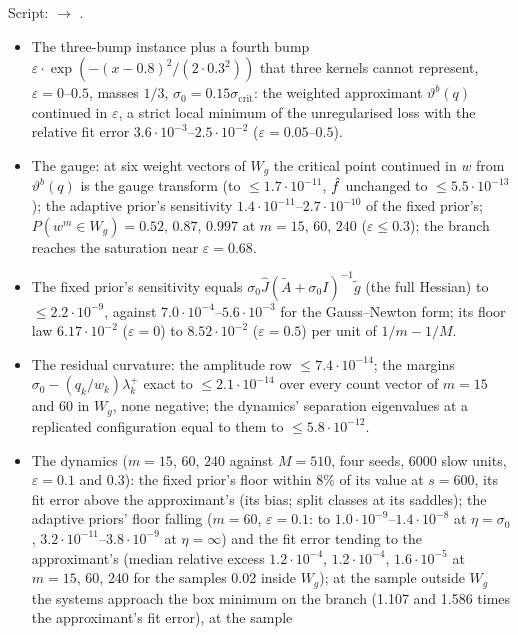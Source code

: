 Script:  $\to$ .
\begin{itemize}
  \item The three-bump instance plus a fourth bump $\varepsilon\cdot\exp(-(x-0.8)^2/(2\cdot0.3^2))$ that three kernels
    cannot represent, $\varepsilon=0$--$0.5$, masses $1/3$, $\sigma_0=0.15\sigma_{\mathrm{crit}}$: the weighted
    approximant $\vartheta^b(q)$ continued in $\varepsilon$, a strict local minimum of the unregularised loss with the
    relative fit error $3.6\cdot10^{-3}$--$2.5\cdot10^{-2}$ ($\varepsilon=0.05$--$0.5$).
  \item The gauge: at six weight vectors of $W_g$ the critical point continued in $w$ from $\vartheta^b(q)$ is the
    gauge transform (to $\le1.7\cdot10^{-11}$, $\hat f$ unchanged to $\le5.5\cdot10^{-13}$); the adaptive prior's
    sensitivity $1.4\cdot10^{-11}$--$2.7\cdot10^{-10}$ of the fixed prior's; $P(w^m\in W_g)=0.52$, $0.87$, $0.997$ at
    $m=15$, $60$, $240$ ($\varepsilon\le0.3$); the branch reaches the saturation near $\varepsilon=0.68$.
  \item The fixed prior's sensitivity equals $\sigma_0\hat J(\tilde A+\sigma_0I)^{-1}\tilde g$ (the full Hessian) to
    $\le2.2\cdot10^{-9}$, against $7.0\cdot10^{-4}$--$5.6\cdot10^{-3}$ for the Gauss--Newton form; its floor law
    $6.17\cdot10^{-2}$ ($\varepsilon=0$) to $8.52\cdot10^{-2}$ ($\varepsilon=0.5$) per unit of $1/m-1/M$.
  \item The residual curvature: the amplitude row $\le7.4\cdot10^{-14}$; the margins $\sigma_0-(q_k/w_k)\lambda^+_k$
    exact to $\le2.1\cdot10^{-14}$ over every count vector of $m=15$ and $60$ in $W_g$, none negative; the dynamics'
    separation eigenvalues at a replicated configuration equal to them to $\le5.8\cdot10^{-12}$.
  \item The dynamics ($m=15$, $60$, $240$ against $M=510$, four seeds, 6000 slow units, $\varepsilon=0.1$ and $0.3$):
    the fixed prior's floor within 8\% of its value at $s=600$, its fit error above the approximant's (its bias; split
    classes at its saddles); the adaptive priors' floor falling ($m=60$, $\varepsilon=0.1$: to
    $1.0\cdot10^{-9}$--$1.4\cdot10^{-8}$ at $\eta=\sigma_0$, $3.2\cdot10^{-11}$--$3.8\cdot10^{-9}$ at $\eta=\infty$)
    and the fit error tending to the approximant's (median relative excess $1.2\cdot10^{-4}$, $1.2\cdot10^{-4}$,
    $1.6\cdot10^{-5}$ at $m=15$, $60$, $240$ for the samples 0.02 inside $W_g$); at the sample outside $W_g$ the systems
    approach the box minimum on the branch (1.107 and 1.586 times the approximant's fit error), at the sample

\end{itemize}
